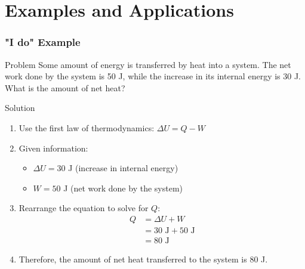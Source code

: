 \documentclass{beamer}
\begin{document}
\section{Examples and Applications}

\begin{frame}
    \frametitle{"I do" Example}
    \begin{block}{Problem}
        Some amount of energy is transferred by heat into a system. The net work done by the system is 50 J, while the increase in its internal energy is 30 J. What is the amount of net heat?
    \end{block}
    \end{frame}

\begin{frame}
    \begin{exampleblock}{Solution}
        \begin{enumerate}
            \item Use the first law of thermodynamics: $\Delta U = Q - W$
            \item Given information:
            \begin{itemize}
                \item $\Delta U = 30$ J (increase in internal energy)
                \item $W = 50$ J (net work done by the system)
            \end{itemize}
            
            \item Rearrange the equation to solve for $Q$:
            \begin{align*}
                Q &= \Delta U + W\\
                &= 30 \text{ J} + 50 \text{ J}\\
                &= 80 \text{ J}
            \end{align*}
            
            \item Therefore, the amount of net heat transferred to the system is 80 J.
        \end{enumerate}
    \end{exampleblock}
\end{frame}
\end{document}
